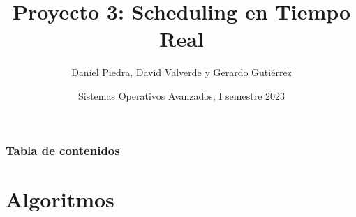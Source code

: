 \documentclass[xcolor=table]{beamer}
\title[Proyecto 3: Scheduling en Tiempo Real] %
{Proyecto 3: Scheduling en Tiempo Real}
\author[ Daniel Piedra, David Valverde, Gerardo Gutiérrez]
{Daniel Piedra, David Valverde y Gerardo Gutiérrez}
\date[Junio 2023] %
{Sistemas Operativos Avanzados, I semestre 2023}
\begin{document}
\frame{\titlepage}


\begin{frame}
\frametitle{Tabla de contenidos}
\tableofcontents
\end{frame}


\section{Algoritmos}


\end{document}
